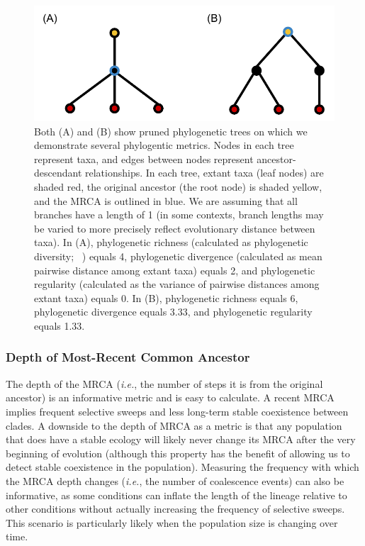 \documentclass[letterpaper]{article}
\begin{document}
\begin{figure}
    \centering
    \includegraphics[width=\linewidth]{figs/toy-phylogeny.pdf}
    \caption{\small Both (A) and (B) show pruned phylogenetic trees on which we demonstrate several phylogentic metrics. 
    Nodes in each tree represent taxa, and edges between nodes represent ancestor-descendant relationships.
    In each tree, extant taxa (leaf nodes) are shaded red, the original ancestor (the root node) is shaded yellow, and the MRCA is outlined in blue. We are assuming that all branches have a length of 1 (in some contexts, branch lengths may be varied to more precisely reflect evolutionary distance between taxa). In (A), phylogenetic richness (calculated as phylogenetic diversity; ~\citealp{faith_conservation_1992}) equals 4, phylogenetic divergence (calculated as mean pairwise distance among extant taxa) equals 2, and phylogenetic regularity (calculated as the variance of pairwise distances among extant taxa) equals 0. In (B), phylogenetic richness equals 6, phylogenetic divergence equals 3.33, and phylogenetic regularity equals %
    1.33.
    }
    \label{fig:toy-phylo}
\end{figure}

\subsubsection{Depth of Most-Recent Common Ancestor}
The depth of the MRCA (\textit{i.e.}, the number of steps it is from the original ancestor) is an informative metric and is easy to calculate.
A recent MRCA implies frequent selective sweeps and less long-term stable coexistence between clades. A downside to the depth of MRCA as a metric is that any population that does have a stable ecology will likely never change its MRCA after the very beginning of evolution (although this property has the benefit of allowing us to detect stable coexistence in the population). Measuring the frequency with which the MRCA depth changes (\textit{i.e.}, the number of coalescence events) can also be informative, as some conditions can inflate the length of the lineage relative to other conditions without actually increasing the frequency of selective sweeps. This scenario is particularly likely when the population size is changing over time. 
\end{document}
